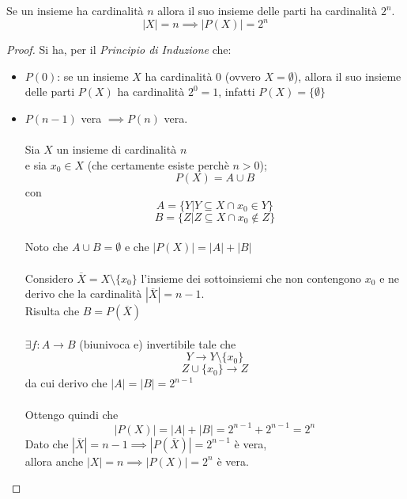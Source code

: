 \documentclass[a4paper,12pt, oneside]{book}
\begin{document}
\begin{shaded}
	\begin{esempio}
		Se un insieme ha cardinalità $n$ allora il suo insieme delle parti ha cardinalità $2^n$.
		\begin{equation}
			|X| = n \implies |P(X)| = 2^n
		\end{equation}
	\end{esempio}
	\begin{proof}
		Si ha, per il \textit{Principio di Induzione} che:\\
		\begin{itemize}
			\item $P(0)$: se un insieme $X$ ha cardinalità 0 (ovvero $X = \emptyset$), allora il suo insieme delle parti $P(X)$ ha cardinalità $2^0 = 1$, infatti $P(X) = \{ \emptyset \}$
			\item $P(n-1)$ vera $\implies P(n)$ vera.\\\\
			      Sia $X$ un insieme di cardinalità $n$\\
			      e sia $x_0 \in X$ (che certamente esiste perchè $n > 0$);
			      $$P(X) = A \cup B$$
			      con
			      $$A = \{Y | Y \subseteq X \cap x_0 \in Y\}$$
			      $$B = \{Z | Z \subseteq X \cap x_0 \not\in Z\}$$\\
			      Noto che $A \cup B = \emptyset$ e che $|P(X)| = |A| + |B|$\\\\
			      Considero $\overline{X} = X \setminus \{ x_0 \}$ l'insieme dei sottoinsiemi che non contengono $x_0$ e ne derivo che la cardinalità $|\overline{X}| = n-1$.\\
			      Risulta che $B = P(\overline{X})$\\\\
			      $\exists f: A \to B$ (biunivoca e) invertibile tale che
			      $$Y \to Y \setminus \{ x_0 \}$$
			      $$Z \cup \{ x_0 \} \to Z$$
			      da cui derivo che $|A| = |B| = 2^{n-1}$\\\\
			      Ottengo quindi che
			      $$|P(X)| = |A| + |B| = 2^{n-1} + 2^{n-1} = 2^n$$
			      Dato che $|\overline{X}| = n-1 \implies |P(\overline{X})| = 2^{n-1}$ è vera,\\
			      allora anche $|X| = n \implies |P(X)| = 2^{n}$ è vera.
		\end{itemize}
	\end{proof}
\end{shaded}
\end{document}
